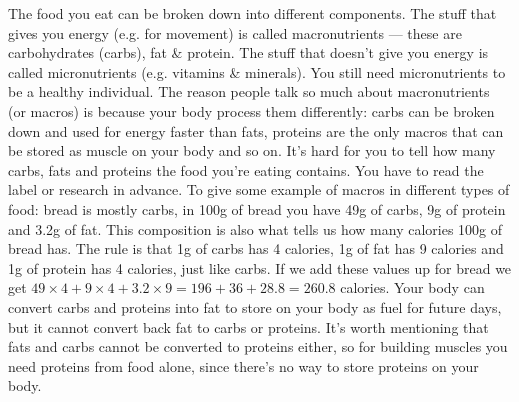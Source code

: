 \documentclass[openany, 12pt]{book}
\begin{document}
	The food you eat can be broken down into different components. The stuff that gives you energy (e.g. for movement) is called macronutrients --- these are carbohydrates
	(carbs), fat \& protein. The stuff that doesn't give you energy is called micronutrients (e.g. vitamins \& minerals). You still need micronutrients to be a healthy individual.
	The reason people talk so much about macronutrients (or macros) is because your body process them differently: carbs can be broken down and used for energy faster than fats,
	proteins are the only macros that can be stored as muscle on your body and so on. It's hard for you to tell how many carbs, fats and proteins the food you're eating contains.
	You have to read the label or research in advance. To give some example of macros in different types of food: bread is mostly carbs, in 100g of bread you have 49g of carbs,
	9g of protein and 3.2g of fat. This composition is also what tells us how many calories 100g of bread has. The rule is that 1g of carbs has 4 calories, 1g of fat has 9 calories
	and 1g of protein has 4 calories, just like carbs. If we add these values up for bread we get $49 \times 4 + 9 \times 4 + 3.2 \times 9 = 196 + 36 + 28.8 = 260.8$ calories. Your
	body can convert carbs and proteins into fat to store on your body as fuel for future days, but it cannot convert back fat to carbs or proteins. It's worth mentioning that
	fats and carbs cannot be converted to proteins either, so for building muscles you need proteins from food alone, since there's no way to store proteins on your body. 
	
\end{document}
